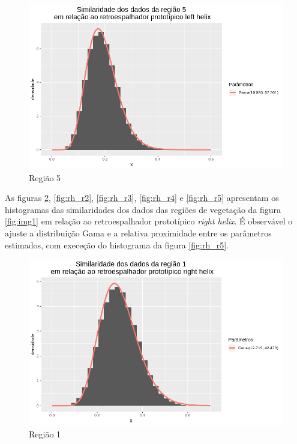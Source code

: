 \documentclass[12pt]{article}
\begin{document}
\begin{figure}[!h]
    \centering
    \vspace{0.1\linewidth}
    \includegraphics[width = \linewidth]{../../Images/Report_18_12_20/lh_region5.png}
    \caption{Região 5}
    \label{fig:lh_r5}
\end{figure}

As figuras \ref{fig:rh_r1}, \ref{fig:rh_r2}, \ref{fig:rh_r3}, \ref{fig:rh_r4} e \ref{fig:rh_r5} apresentam os histogramas das similaridades dos dados das regiões de vegetação da figura \ref{fig:img1} em relação ao retroespalhador prototípico \textit{right helix}. É observável o ajuste a distribuição Gama e a relativa proximidade entre os parâmetros estimados, com execeção do histograma da figura \ref{fig:rh_r5}.

\begin{figure}[!h]
    \centering
    \includegraphics[width = \linewidth]{../../Images/Report_18_12_20/rh_region1.png}
    \caption{Região 1}
    \label{fig:rh_r1}
\end{figure}
\end{document}
